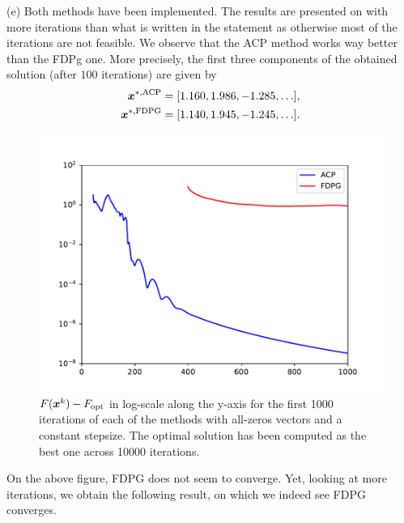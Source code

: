 \indent (e) Both methods have been implemented.  The results are presented on  with more iterations than what is written in the statement as otherwise most of the iterations are not feasible. We observe that the ACP method works way better than the FDPg one. More precisely, the first three components of the obtained solution (after $100$ iterations) are given by
           \begin{align*}
       \boldsymbol x^{*,\text{ACP}} &= [ 1.160,  1.986, -1.285,\hdots],\\
        \boldsymbol x^{*,\text{FDPG}} &= [1.140,  1.945, -1.245,\hdots].
       \end{align*}
    \begin{figure}[H]
    \centering
    \includegraphics[width=14cm]{images/part3_ex2_fig2.pdf}
    \caption{$F(\boldsymbol x^k)-F_{\text{opt}}$ in log-scale along the 
  y-axis for the first 1000 iterations of each of the methods 
  with all-zeros vectors and a constant stepsize. The optimal solution has been computed as the best one across 10000 iterations. }
  \label{fig:ex5}
\end{figure}
On the above figure, FDPG does not seem to converge. Yet, looking at more iterations, we obtain the following result, on which we indeed see FDPG converges. 
